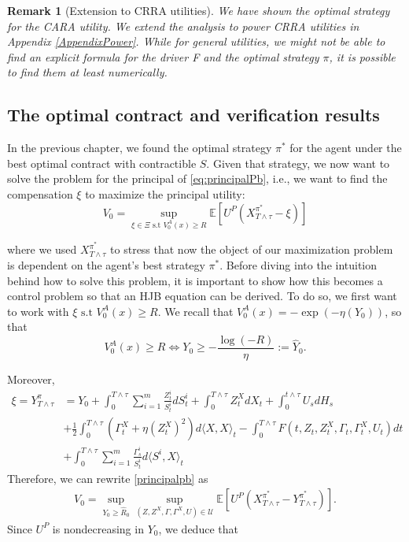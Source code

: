 \documentclass[11pt,a4paper]{article}
\theoremstyle{thmstyleone}%
\theoremstyle{thmstyletwo}%
\newtheorem{remark}{Remark}%
\theoremstyle{thmstylethree}%
\newcommand{\T}{T \wedge \tau}
\begin{document}
\begin{remark}[Extension to CRRA utilities]
We have shown the optimal strategy for the CARA utility. We extend the analysis to power CRRA utilities in Appendix \ref{AppendixPower}. While for general utilities, we might not be able to find an explicit formula for the driver F and the optimal strategy $\pi$, it is possible to find them at least numerically. 
\end{remark}



\subsection{The optimal contract and verification results}\label{chap4}
In the previous chapter, we found the optimal strategy $\pi^*$ for the agent under the best optimal contract with contractible $S$. Given that strategy, we now want to solve the problem for the principal of \eqref{eq:principalPb}, i.e., we want to find the compensation $\xi$ to maximize the principal utility:
\begin{equation}\label{principalpb}
   V_0= \sup_{\xi\in \Xi \text{ s.t } V_0^A(x) \geq R}\mathbb{E}[U^P(X_{\T}^{\pi^*} - \xi)]
\end{equation}

where we used $X_{\T}^{\pi^*}$ to stress that now the object of our maximization problem is dependent on the agent’s best strategy $\pi^*$. Before diving into the intuition behind how to solve this problem, it is important to show how this becomes a control problem so that an HJB equation can be derived. To do so, we first want to work with $\xi \text{ s.t } V_0^A(x) \geq R$. 
We recall that $V_0^A(x) = -\exp( - \eta( Y_0))$, so that
\[ V_0^A(x) \geq R \Longleftrightarrow  Y_0 \geq - \frac{\log(-R)}{\eta} := \widehat{Y}_0.
\]

Moreover,
\begin{align}\label{xi:decomp}
   \nonumber \xi= Y^\pi_{\T} &=Y_0+ \int_{0}^{\T} \sum_{i=1}^m \frac{Z^i_t}{S^i_t} dS^i_t + \int_0^{\T} Z_t^X dX_t + \int_{0}^{t \wedge \tau} U_s dH_s \\
     \nonumber &+ \frac{1}{2}\int_0^{\T} (\Gamma_t^X + \eta (Z_t^X)^2 ) d\langle X, X\rangle_t - \int_0^{\T} F(t, Z_t, Z_t^X, \Gamma_t, \Gamma_t^X,U_t) dt\\
      &+\int_0^{\T} \sum_{i=1}^m \frac{\Gamma^i_s}{S^i_t} d\langle S^i, X\rangle_t 
\end{align}
Therefore, we can rewrite \eqref{principalpb} as
  \begin{align*} 
    V_0=\sup_{Y_0\geq \hat R_0} \sup_{(Z, Z^X, \Gamma, \Gamma^X, U)\in \mathcal U} \mathbb{E}[U^P(X_{\T}^{\pi^*} -Y^{\pi^*}_{\T})].
\end{align*}
Since $U^P$ is nondecreasing in $Y_0$, we deduce that 
\end{document}
